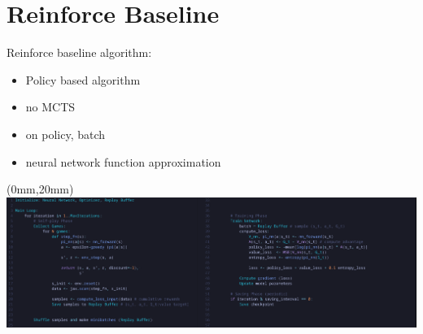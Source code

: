 \documentclass[aspectratio=169,xcolor=dvipsnames]{beamer}
\begin{document}
\section{Reinforce Baseline}

\begin{frame}{}
    Reinforce baseline algorithm:

    \medskip
    \begin{itemize}
    \item Policy based algorithm
    \item no MCTS
    \item on policy, batch
    \item neural network function approximation
\end{itemize}
\end{frame}

\begin{frame}{}
    \begin{textblock*}{\paperwidth}(0mm,20mm) %
        \includegraphics[width=\paperwidth,height=\paperheight,keepaspectratio]{reinforce_algo.png}
    \end{textblock*}
\end{frame}
\end{document}
